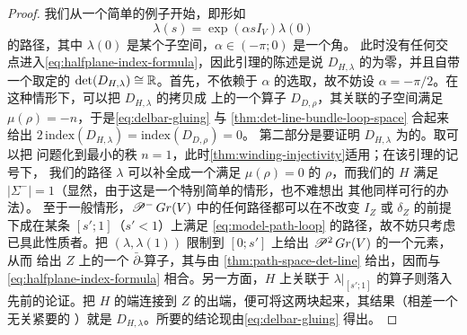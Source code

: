 \begin{proof}
我们从一个简单的例子开始，即形如
\begin{equation}\label{eq:model-path-loop}
\lambda(s)=\exp(\alpha s I_V)\lambda(0)
\end{equation}
的路径，其中 $\lambda(0)$ 是某个\trLagrange{}子空间，$\alpha\in(-\pi;0)$ 是一个角。
此时没有任何交点进入\eqref{eq:halfplane-index-formula}，因此引理的陈述是说
$D_{H,\lambda}$ 的\trIndex{}为零，并且自带一个取定的\trIsomorphism
$\det(D_{H,\lambda})\cong\mathbb{R}$。首先，\trIndex{}不依赖于 $\alpha$ 的选取，故不妨设
$\alpha=-\pi/2$。在这种情形下，可以把 $D_{H,\lambda}$ 的拷贝\trGluing{}成%
\trDisk{}上的一个算子 $D_{D,\rho}$，其关联的\trLagrange{}子空间\trLoop{}满足
$\mu(\rho)=-n$，于是\eqref{eq:delbar-gluing} 与
\cref{thm:det-line-bundle-loop-space} 合起来给出
$2\,\mathrm{index}(D_{H,\lambda})=\mathrm{index}(D_{D,\rho})=0$。
第二部分是要证明 $D_{H,\lambda}$ 为\trInjective{}的。取\trDirectSummand{}可以把
问题化到最小的秩 $n=1$，此时\cref{thm:winding-injectivity}适用；在该引理的记号下，
我们的路径 $\lambda$ 可以补全成一个满足 $\mu(\rho)=0$ 的\trLoop{} $\rho$，而我们的%
\trSurface{} $H$ 满足 $|\Sigma^-|=1$（显然，由于这是一个特别简单的情形，也不难想出
其他同样可行的办法）。
至于一般情形，$\mathscr{P}^-\,Gr(V)$ 中的任何路径都可以在不改变 $I_Z$ 或 $\delta_Z$
的前提下\trDeformation{}成在某条 $[s';1]$（$s'<1$）上满足
\eqref{eq:model-path-loop} 的路径，故不妨只考虑已具此性质者。把
$(\lambda,\lambda(1))$ 限制到 $[0;s']$ 上给出 $\mathscr{P}^2\,Gr(V)$ 的一个元素，从而
给出 $Z$ 上的一个 $\bar\partial$-算子，其\trIndex{}与\trDeterminantLine{}由
\cref{thm:path-space-det-line} 给出，因而与\eqref{eq:halfplane-index-formula}
相合。另一方面，$H$ 上关联于 $\lambda|_{[s';1]}$ 的算子则落入先前的论证。把 $H$
的端连接到 $Z$ 的出端，便可将这两块\trGluing{}起来，其结果（相差一个无关紧要的%
\trDeformation）就是 $D_{H,\lambda}$。所要的结论现由\eqref{eq:delbar-gluing}
得出。
\end{proof}
